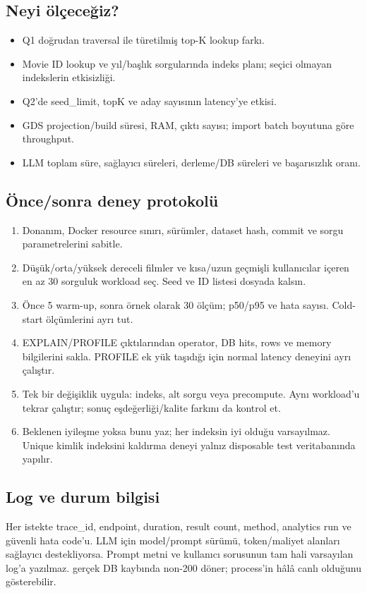 \documentclass[11pt,a4paper]{article}
\newcommand{\code}[1]{\texttt{\detokenize{#1}}}
\begin{document}
\subsection{Neyi ölçeceğiz?}
\begin{itemize}
\item Q1 doğrudan traversal ile türetilmiş top-K lookup farkı.
\item Movie ID lookup ve yıl/başlık sorgularında indeks planı; seçici olmayan indekslerin etkisizliği.
\item Q2'de seed\_limit, topK ve aday sayısının latency'ye etkisi.
\item GDS projection/build süresi, RAM, çıktı sayısı; import batch boyutuna göre throughput.
\item LLM toplam süre, sağlayıcı süreleri, derleme/DB süreleri ve başarısızlık oranı.
\end{itemize}

\subsection{Önce/sonra deney protokolü}
\begin{enumerate}
\item Donanım, Docker resource sınırı, sürümler, dataset hash, commit ve sorgu parametrelerini sabitle.
\item Düşük/orta/yüksek dereceli filmler ve kısa/uzun geçmişli kullanıcılar içeren en az 30 sorguluk workload seç. Seed ve ID listesi dosyada kalsın.
\item Önce 5 warm-up, sonra örnek olarak 30 ölçüm; p50/p95 ve hata sayısı. Cold-start ölçümlerini ayrı tut.
\item EXPLAIN/PROFILE çıktılarından operator, DB hits, rows ve memory bilgilerini sakla. PROFILE ek yük taşıdığı için normal latency deneyini ayrı çalıştır.
\item Tek bir değişiklik uygula: indeks, alt sorgu veya precompute. Aynı workload'u tekrar çalıştır; sonuç eşdeğerliği/kalite farkını da kontrol et.
\item Beklenen iyileşme yoksa bunu yaz; her indeksin iyi olduğu varsayılmaz. Unique kimlik indeksini kaldırma deneyi yalnız disposable test veritabanında yapılır.
\end{enumerate}

\subsection{Log ve durum bilgisi}
Her istekte trace\_id, endpoint, duration, result count, method, analytics run ve güvenli hata code'u. LLM için model/prompt sürümü, token/maliyet alanları sağlayıcı destekliyorsa. Prompt metni ve kullanıcı sorusunun tam hali varsayılan log'a yazılmaz. \code{/health/ready} gerçek DB kaybında non-200 döner; \code{/health/live} process'in hâlâ canlı olduğunu gösterebilir.
\end{document}
